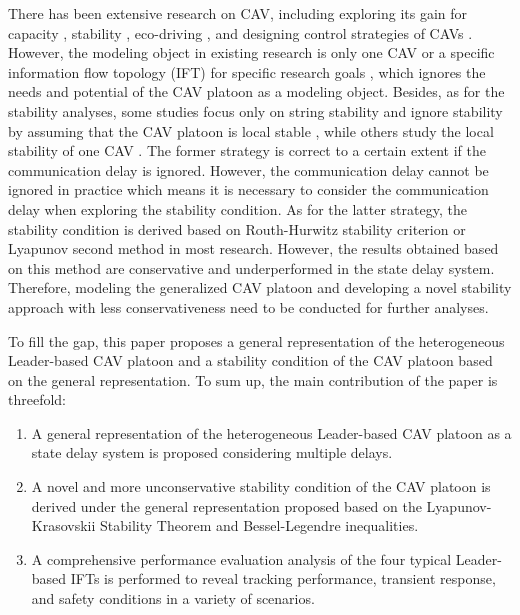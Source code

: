 \documentclass[a4paper]{cas-sc}
\begin{document}
There has been extensive research on CAV, including exploring its gain for capacity \citep{Ghiasi2017,Chang2020}, stability \citep{Zhou2019,Montanino2021}, eco-driving \citep{Qin2018,Ruan2022}, and designing control strategies of CAVs \citep{Zhu2019,Chen2021}. However, the modeling object in existing research is only one CAV \citep{Wei2017,Navas2016,Milanes2014a} or a specific information flow topology (IFT) for specific research goals \citep{Wang2021,Chin2015}, which ignores the needs and potential of the CAV platoon as a modeling object. Besides, as for the stability analyses, some studies focus only on string stability and ignore stability by assuming that the CAV platoon is local stable \citep{Studli2017,Wang2018a}, while others study the local stability of one CAV \citep{Zhou2019a,Monteil2019}. The former strategy is correct to a certain extent if the communication delay is ignored. However, the communication delay cannot be ignored in practice which means it is necessary to consider the communication delay when exploring the stability condition. As for the latter strategy, the stability condition is derived based on Routh-Hurwitz stability criterion or Lyapunov second method in most research. However, the results obtained based on this method are conservative and underperformed in the state delay system. Therefore, modeling the generalized CAV platoon and developing a novel stability approach with less conservativeness need to be conducted for further analyses.

To fill the gap, this paper proposes a general representation of the heterogeneous Leader-based CAV platoon and a stability condition of the CAV platoon based on the general representation. To sum up, the main contribution of the paper is threefold:
\begin{enumerate}
  \item A general representation of the heterogeneous Leader-based CAV platoon as a state delay system is proposed considering multiple delays.
  \item A novel and more unconservative stability condition of the CAV platoon is derived under the general representation proposed based on the Lyapunov-Krasovskii Stability Theorem and Bessel-Legendre inequalities.
  \item A comprehensive performance evaluation analysis of the four typical Leader-based IFTs is performed to reveal tracking performance, transient response, and safety conditions in a variety of scenarios.
\end{enumerate}
\end{document}
